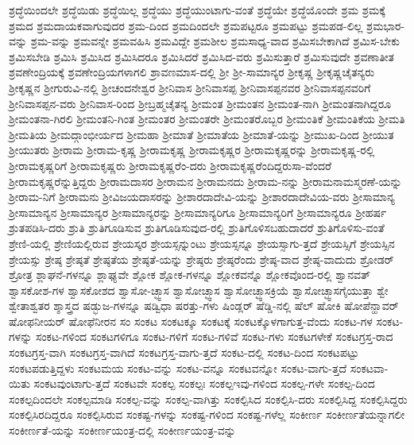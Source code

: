 {ಶ್ರದ್ಧೆಯಿಂದಲೇ
ಶ್ರದ್ಧೆಯಿಡು
ಶ್ರದ್ಧೆಯಿಲ್ಲ
ಶ್ರದ್ಧೆಯು
ಶ್ರದ್ಧೆಯುಂಟಾಗು-ವಂತೆ
ಶ್ರದ್ಧೆಯೇ
ಶ್ರದ್ಧೆಯೊಂದೇ
ಶ್ರಮ
ಶ್ರಮಕ್ಕೆ
ಶ್ರಮದ
ಶ್ರಮದಾಯಕವಾಗುವುದರ
ಶ್ರಮ-ದಿಂದ
ಶ್ರಮದಿಂದಲೇ
ಶ್ರಮಪಟ್ಟರೂ
ಶ್ರಮಪಟ್ಟು
ಶ್ರಮಪಡ-ಲಿಲ್ಲ
ಶ್ರಮಭಾರ-ವನ್ನು
ಶ್ರಮ-ವನ್ನು
ಶ್ರಮವನ್ನೇ
ಶ್ರಮವಹಿಸಿ
ಶ್ರಮವಿದ್ದೇ
ಶ್ರಮಶೀಲ
ಶ್ರಮಸಾಧ್ಯ-ವಾದ
ಶ್ರಮಿಸಬೇಕಾಗಿದೆ
ಶ್ರಮಿಸ-ಬೇಕು
ಶ್ರಮಿಸಬೇಡಿ
ಶ್ರಮಿಸಿ
ಶ್ರಮಿಸಿದ
ಶ್ರಮಿಸಿದರೂ
ಶ್ರಮಿಸಿದರೆ
ಶ್ರಮಿಸಿದ-ವರು
ಶ್ರಮಿಸುತ್ತಾರೆ
ಶ್ರಮಿಸುವುದೇ
ಶ್ರವಣಾತೀತ
ಶ್ರವಣೇಂದ್ರಿಯಕ್ಕೆ
ಶ್ರವಣೇಂದ್ರಿಯಗಳಾಗಲಿ
ಶ್ರಾವಣಮಾಸ-ದಲ್ಲಿ
ಶ್ರೀ
ಶ್ರೀ-ಸಾಮಾನ್ಯರ
ಶ್ರೀಕೃಷ್ಣ
ಶ್ರೀಕೃಷ್ಣಚೈತನ್ಯರು
ಶ್ರೀಕೃಷ್ಣನ
ಶ್ರೀಗುರುವಿ-ನಲ್ಲಿ
ಶ್ರೀಚಂದನೇಶ್ವರ
ಶ್ರೀನಿವಾಸ
ಶ್ರೀನಿವಾಸಪ್ಪ
ಶ್ರೀನಿವಾಸಪ್ಪನವರ
ಶ್ರೀನಿವಾಸಪ್ಪನವರಿಗೆ
ಶ್ರೀನಿವಾಸಪ್ಪನ-ವರು
ಶ್ರೀನಿವಾಸ-ರಿಂದ
ಶ್ರೀಬ್ರಹ್ಮಚೈತನ್ಯ
ಶ್ರೀಮಂತ
ಶ್ರೀಮಂತನ
ಶ್ರೀಮಂತ-ನಾಗಿ
ಶ್ರೀಮಂತನಾಗಿದ್ದರೂ
ಶ್ರೀಮಂತನಾ-ಗಿರಲಿ
ಶ್ರೀಮಂತನಿ-ಗಿಂತ
ಶ್ರೀಮಂತರ
ಶ್ರೀಮಂತರೇ
ಶ್ರೀಮಂತರೊಬ್ಬರ
ಶ್ರೀಮಂತಿಕೆ
ಶ್ರೀಮಂತಿಕೆಯ
ಶ್ರೀಮತಿ
ಶ್ರೀಮತಿಯ
ಶ್ರೀಮದ್ಗಾಂಭೀರ್ಯದ
ಶ್ರೀಮಹಾ
ಶ್ರೀಮಾತೆ
ಶ್ರೀಮಾತೆಯ
ಶ್ರೀಮಾತೆ-ಯನ್ನು
ಶ್ರೀಮುಖ-ದಿಂದ
ಶ್ರೀಯುತ
ಶ್ರೀಯುತರು
ಶ್ರೀರಾಮ
ಶ್ರೀರಾಮ-ಕೃಷ್ಣ
ಶ್ರೀರಾಮಕೃಷ್ಣ
ಶ್ರೀರಾಮಕೃಷ್ಣರ
ಶ್ರೀರಾಮಕೃಷ್ಣರನ್ನು
ಶ್ರೀರಾಮಕೃಷ್ಣ-ರಲ್ಲಿ
ಶ್ರೀರಾಮಕೃಷ್ಣರಿಗೆ
ಶ್ರೀರಾಮಕೃಷ್ಣರು
ಶ್ರೀರಾಮಕೃಷ್ಣರೆಂ-ದರು
ಶ್ರೀರಾಮಕೃಷ್ಣರೆಂದಿದ್ದರುಸಾ-ವೆಂದರೆ
ಶ್ರೀರಾಮಕೃಷ್ಣರೆನ್ನುತ್ತಿದ್ದರು
ಶ್ರೀರಾಮದಾಸರ
ಶ್ರೀರಾಮನ
ಶ್ರೀರಾಮನದು
ಶ್ರೀರಾಮ-ನನ್ನು
ಶ್ರೀರಾಮನಾಮಸ್ಮರಣೆ-ಯನ್ನು
ಶ್ರೀರಾಮ-ನಿಗೆ
ಶ್ರೀರಾಮನು
ಶ್ರೀವಿಜಯದಾಸರನ್ನು
ಶ್ರೀಶಾರದಾದೇವಿ-ಯನ್ನು
ಶ್ರೀಶಾರದಾದೇವಿಯ-ವರು
ಶ್ರೀಸಾಮಾನ್ಯ
ಶ್ರೀಸಾಮಾನ್ಯನ
ಶ್ರೀಸಾಮಾನ್ಯರ
ಶ್ರೀಸಾಮಾನ್ಯರನ್ನು
ಶ್ರೀಸಾಮಾನ್ಯರಿಗೂ
ಶ್ರೀಸಾಮಾನ್ಯರಿಗೆ
ಶ್ರೀಸಾಮಾನ್ಯರೂ
ಶ್ರೀಹರ್ಷ
ಶ್ರುತಪಡಿಸಿ-ದರು
ಶ್ರುತಿ
ಶ್ರುತಿಗೂಡಿಸುವ
ಶ್ರುತಿಗೂಡಿಸುವುದ-ರಲ್ಲಿ
ಶ್ರುತಿಗೊಳಿಸಬಹುದಾದರೆ
ಶ್ರುತಿಗೊಳಿಸು-ವಂತೆ
ಶ್ರೇಣಿ-ಯಲ್ಲಿ
ಶ್ರೇಣಿಯಲ್ಲಿರುವ
ಶ್ರೇಯಸ್ಕರ
ಶ್ರೇಯಸ್ಸನ್ನುಂಟು
ಶ್ರೇಯಸ್ಸನ್ನೂ
ಶ್ರೇಯಸ್ಸಾಗು-ತ್ತದೆ
ಶ್ರೇಯಸ್ಸಿಗೆ
ಶ್ರೇಯಸ್ಸಿನ
ಶ್ರೇಯಸ್ಸು
ಶ್ರೇಷ್ಠ
ಶ್ರೇಷ್ಠತೆ
ಶ್ರೇಷ್ಠತೆಯ
ಶ್ರೇಷ್ಠತೆ-ಯನ್ನು
ಶ್ರೇಷ್ಠರು
ಶ್ರೇಷ್ಠರೆಂದು
ಶ್ರೇಷ್ಠ-ವಾದ
ಶ್ರೇಷ್ಠ-ವಾದುದು
ಶ್ರೋಡರ್
ಶ್ರೋತ್ರ
ಶ್ಲಾಘನೆ-ಗಳನ್ನೂ
ಶ್ಲಾಘ್ಯವೇ
ಶ್ಲೋಕ
ಶ್ಲೋಕ-ಗಳನ್ನೂ
ಶ್ಲೋಕವನ್ನೊ
ಶ್ಲೋಕವೊಂದ-ರಲ್ಲಿ
ಶ್ವಾನವತ್
ಶ್ವಾಸಕೋಶ-ಗಳ
ಶ್ವಾಸಕೋಶದ
ಶ್ವಾಸೋ-ಚ್ಛ್ವಾಸ
ಶ್ವಾಸೋಚ್ಛ್ವಾಸ
ಶ್ವಾಸೋಚ್ಛ್ವಾಸಕ್ರಿಯೆ
ಶ್ವಾಸೋಚ್ಛ್ವಾಸಗೈಯುತ್ತಾ
ಶ್ವೇ
ಶ್ವೇತಾಶ್ವತರ
ಶ್ಶಾಸ್ತ್ರದ
ಷಡ್ಭುಜ-ಗಳನ್ನೂ
ಷಡ್ವಿಧಾ
ಷರತ್ತು-ಗಳು
ಷಿಂಡ್ಲರ್
ಷೆಡ್ಡಿ-ನಲ್ಲಿ
ಷೆಲ್
ಷೋಕಿ
ಷೋಪೆನ್ಹಾವರ್
ಷೋಫನೀಯರ್
ಷೋಫೆನೀರನ
ಸಂ
ಸಂಕಟ
ಸಂಕಟಕ್ಕೂ
ಸಂಕಟಕ್ಕೆ
ಸಂಕಟಕ್ಕೊಳಗಾಗುತ್ತ-ವೆಂದು
ಸಂಕಟ-ಗಳ
ಸಂಕಟ-ಗಳನ್ನು
ಸಂಕಟ-ಗಳಿಂದ
ಸಂಕಟಗಳಿಗೂ
ಸಂಕಟ-ಗಳಿಗೆ
ಸಂಕಟ-ಗಳಿವೆ
ಸಂಕಟ-ಗಳು
ಸಂಕಟಗಳೇಕೆ
ಸಂಕಟಗ್ರಸ್ತ-ರಾದ
ಸಂಕಟಗ್ರಸ್ತ-ವಾಗಿ
ಸಂಕಟಗ್ರಸ್ತ-ವಾಗಿದೆ
ಸಂಕಟಗ್ರಸ್ತ-ವಾಗು-ತ್ತದೆ
ಸಂಕಟ-ದಲ್ಲಿ
ಸಂಕಟ-ದಿಂದ
ಸಂಕಟಪಟ್ಟು
ಸಂಕಟಪಡುತ್ತಿದ್ದಳು
ಸಂಕಟಮಯ
ಸಂಕಟ-ವನ್ನು
ಸಂಕಟ-ವನ್ನೂ
ಸಂಕಟವನ್ನೋ
ಸಂಕಟ-ವಾಗು-ತ್ತದೆ
ಸಂಕಟವಾ-ಯಿತು
ಸಂಕಟವುಂಟಾಗು-ತ್ತದೆ
ಸಂಕಟವೇ
ಸಂಕಲ್ಪ
ಸಂಕಲ್ಪಃ
ಸಂಕಲ್ಪಇವು-ಗಳಿಂದ
ಸಂಕಲ್ಪ-ಗಳೇ
ಸಂಕಲ್ಪ-ದಿಂದ
ಸಂಕಲ್ಪದಿಂದಲೇ
ಸಂಕಲ್ಪಮಾಡಿ
ಸಂಕಲ್ಪ-ವನ್ನು
ಸಂಕಲ್ಪ-ವಾಗಿತ್ತು
ಸಂಕಲ್ಪಿಸಿದ
ಸಂಕಲ್ಪಿಸಿ-ದರು
ಸಂಕಲ್ಪಿಸಿದ್ದ
ಸಂಕಲ್ಪಿಸಿದ್ದರು
ಸಂಕಲ್ಪಿಸಿರದಿದ್ದರೂ
ಸಂಕಲ್ಪಿಸಿರುವ
ಸಂಕಷ್ಟ-ಗಳನ್ನು
ಸಂಕಷ್ಟ-ಗಳಿಂದ
ಸಂಕಷ್ಟ-ಗಳೆಲ್ಲ
ಸಂಕೀರ್ಣ
ಸಂಕೀರ್ಣತೆಯನ್ನಾಗಲೀ
ಸಂಕೀರ್ಣತೆ-ಯನ್ನು
ಸಂಕೀರ್ಣಯಂತ್ರ-ದಲ್ಲಿ
ಸಂಕೀರ್ಣಯಂತ್ರ-ವನ್ನು
}
